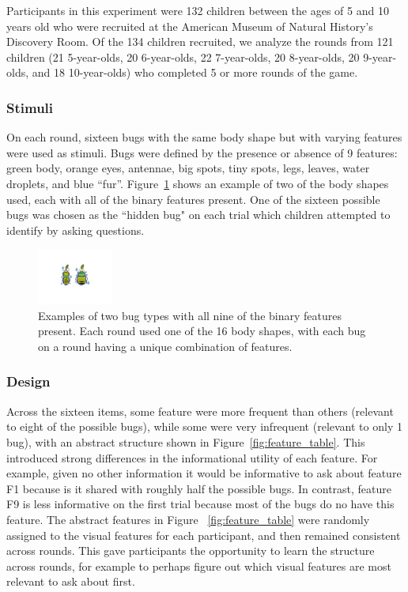 \documentclass[10pt,letterpaper]{article}
\begin{document}
Participants in this experiment were 132 children between the ages of 5 and 10 
years old who were recruited at the American Museum of Natural History's 
Discovery Room. Of the 134 children recruited, we analyze the rounds from 121 
children (21 5-year-olds, 20 6-year-olds, 22 7-year-olds, 20 8-year-olds, 20 9-year-olds, 
and 18 10-year-olds) who completed 5 or more rounds of the game.

\subsubsection{Stimuli}

On each round, sixteen bugs with the same body shape but with varying features were used as stimuli. Bugs were defined by the presence or absence of 9 features: green body, 
orange eyes, antennae, big spots, tiny spots, legs, leaves, water droplets, and blue 
``fur''. Figure~\ref{fig:example_bugs} shows an example of two of the body shapes used, each with all of the binary features present. One of the sixteen possible bugs was chosen as the ``hidden bug" on each trial which 
children attempted to identify by asking questions.


\begin{figure}[h]
  \centering
  \includegraphics[width=0.22\textwidth]{figures/example_bugs}
  \caption{Examples of two bug types with all nine of the binary features present. Each round used one of the 16 
body shapes, with each bug on a round having a unique combination of features.}
  \label{fig:example_bugs}
\end{figure} 

\subsubsection{Design}

Across the sixteen items, some feature were more frequent than others (relevant to eight of the possible
bugs), while some were very infrequent (relevant to only 1 bug), with an
abstract structure shown in Figure~\ref{fig:feature_table}. This introduced
strong differences in the informational utility of each feature.  For example,
given no other information it would be informative to ask about feature F1
because is it shared with roughly half the possible bugs.  In contrast, feature
F9 is less informative on the first trial because most of the bugs do no have this
feature. The abstract features in Figure~
\ref{fig:feature_table} were randomly assigned to the visual features for each 
participant, and then remained consistent across rounds. This gave participants the 
opportunity to learn the structure across rounds, for example to perhaps figure out 
which visual features are most relevant to ask about first.
\end{document}
